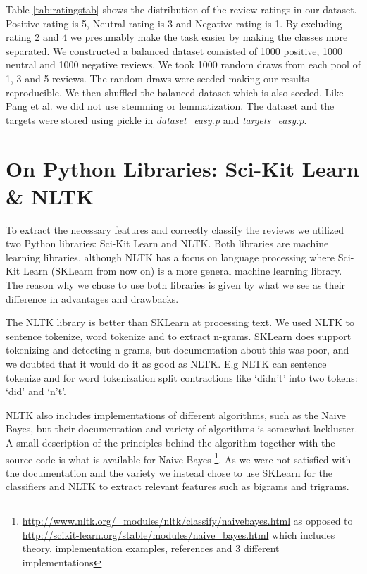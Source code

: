 \documentclass{article}
\begin{document}
Table \ref{tab:ratingstab} shows the distribution of the review ratings in our dataset. Positive rating is 5, Neutral rating is 3 and Negative rating is 1. By excluding rating 2 and 4 we presumably make the task easier by making the classes more separated. We constructed a balanced dataset consisted of 1000 positive, 1000 neutral and 1000 negative reviews. We took 1000 random draws from each pool of 1, 3 and 5 reviews. The random draws were seeded making our results reproducible. We then shuffled the balanced dataset which is also seeded. Like Pang et al. we did not use stemming or lemmatization. The dataset and the targets were stored using pickle in \textit{dataset\_easy.p} and \textit{targets\_easy.p}.

\section{On Python Libraries:  Sci-Kit Learn \& NLTK}
To extract the necessary features and correctly classify the reviews we utilized two Python libraries: Sci-Kit Learn\cite{web:sklearn} and NLTK\cite{web:nltk}. Both libraries are machine learning libraries, although NLTK has a focus on language processing where Sci-Kit Learn (SKLearn from now on) is a more general machine learning library. The reason why we chose to use both libraries is given by what we see as their difference in advantages and drawbacks.

The NLTK library is better than SKLearn at processing text. We used NLTK to sentence tokenize, word tokenize and to extract n-grams. SKLearn does support tokenizing and detecting n-grams, but documentation about this was poor, and we doubted that it would do it as good as NLTK. E.g NLTK can sentence tokenize and for word tokenization split contractions like `didn't' into two tokens: `did' and `n't'. 

NLTK also includes implementations of different algorithms, such as the Naive Bayes, but their documentation and variety of algorithms is somewhat lackluster. A small description of the principles behind the algorithm together with the source code is what is available for Naive Bayes \footnote{\url{http://www.nltk.org/_modules/nltk/classify/naivebayes.html} as opposed to \url{http://scikit-learn.org/stable/modules/naive_bayes.html} which includes theory, implementation examples, references and 3 different implementations}. As we were not satisfied with the documentation and the variety we instead chose to use SKLearn for the classifiers and NLTK to extract relevant features such as bigrams and trigrams. 
\end{document}

